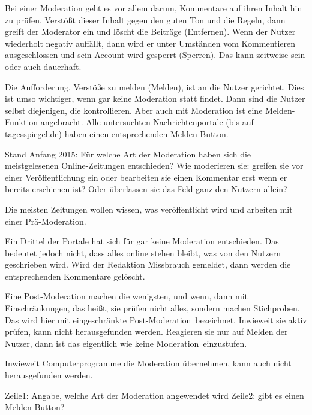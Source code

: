 
Bei einer Moderation geht es vor allem darum, Kommentare auf ihren Inhalt hin zu
prüfen. Verstößt dieser Inhalt gegen den guten Ton und die Regeln, dann greift
der Moderator ein und löscht die Beiträge (Entfernen). Wenn der Nutzer
wiederholt negativ auffällt, dann wird er unter Umständen vom Kommentieren
ausgeschlossen und sein Account wird gesperrt (Sperren). Das kann zeitweise sein
oder auch dauerhaft.

Die Aufforderung, Verstöße zu melden (Melden), ist an die Nutzer gerichtet. Dies
ist umso wichtiger, wenn gar keine Moderation statt findet. Dann sind die Nutzer
selbst diejenigen, die kontrollieren. Aber auch mit Moderation ist eine
Melden-Funktion angebracht. Alle  untersuchten Nachrichtenportale (bis auf
tagesspiegel.de) haben einen entsprechenden Melden-Button.

Stand Anfang 2015: Für welche Art der Moderation haben sich die meistgelesenen
Online-Zeitungen entschieden? Wie moderieren sie: greifen sie vor einer
Veröffentlichung ein oder bearbeiten sie einen Kommentar erst wenn er bereits
erschienen ist? Oder überlassen sie das Feld ganz den Nutzern allein?

Die meisten Zeitungen wollen wissen, was veröffentlicht wird und arbeiten mit
einer Prä-Moderation.

Ein Drittel der Portale hat sich für gar keine Moderation entschieden. Das
bedeutet jedoch nicht, dass alles online stehen bleibt, was von den Nutzern
geschrieben wird. Wird der Redaktion Missbrauch gemeldet, dann werden die
entsprechenden Kommentare gelöscht.

Eine Post-Moderation machen die wenigsten, und wenn, dann mit Einschränkungen,
das heißt, sie prüfen nicht alles, sondern machen Stichproben. Das wird hier mit
\glqq eingeschränkte Post-Moderation\grqq\ bezeichnet. Inwieweit sie aktiv prüfen,
kann nicht herausgefunden werden. Reagieren sie nur auf Melden der Nutzer, dann
ist das eigentlich wie \glqq keine Moderation\grqq\ einzustufen.

Inwieweit Computerprogramme die Moderation übernehmen, kann auch nicht
herausgefunden werden. 

Zeile1: Angabe, welche Art der Moderation angewendet wird
Zeile2: gibt es einen Melden-Button?



